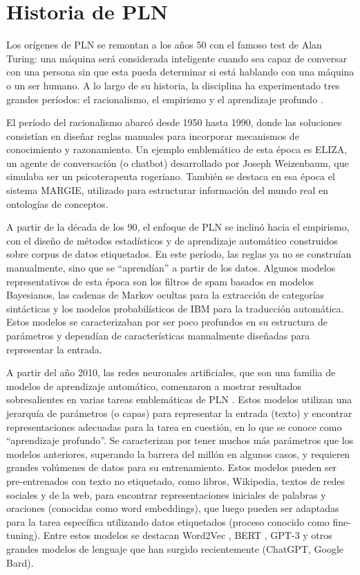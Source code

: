 \section{Historia de PLN}

Los orígenes de PLN se remontan a los años 50 con el famoso test de Alan Turing: una máquina será considerada inteligente cuando sea capaz de conversar con una persona sin que esta pueda determinar si está hablando con una máquina o un ser humano. A lo largo de su historia, la disciplina ha experimentado tres grandes períodos: el racionalismo, el empirismo y el aprendizaje profundo \cite{deng2018deep}.

El período del racionalismo abarcó desde 1950 hasta 1990, donde las soluciones consistían en diseñar reglas manuales para incorporar mecanismos de conocimiento y razonamiento. Un ejemplo emblemático de esta época es ELIZA, un agente de conversación (o chatbot) desarrollado por Joseph Weizenbaum, que simulaba ser un psicoterapeuta rogeriano. También se destaca en esa época el sistema MARGIE, utilizado para estructurar información del mundo real en ontologías de conceptos.

A partir de la década de los 90, el enfoque de PLN se inclinó hacia el empirismo, con el diseño de métodos estadísticos y de aprendizaje automático construidos sobre corpus de datos etiquetados. En este período, las reglas ya no se construían manualmente, sino que se ``aprendían'' a partir de los datos. Algunos modelos representativos de esta época son los filtros de spam basados en modelos Bayesianos, las cadenas de Markov ocultas para la extracción de categorías sintácticas y los modelos probabilísticos de IBM para la traducción automática. Estos modelos se caracterizaban por ser poco profundos en su estructura de parámetros y dependían de características manualmente diseñadas para representar la entrada.

A partir del año 2010, las redes neuronales artificiales, que son una familia de modelos de aprendizaje automático, comenzaron a mostrar resultados sobresalientes en varias tareas emblemáticas de PLN \cite{collobert2011natural}. Estos modelos utilizan una jerarquía de parámetros (o capas) para representar la entrada (texto) y encontrar representaciones adecuadas para la tarea en cuestión, en lo que se conoce como ``aprendizaje profundo''. Se caracterizan por tener muchos más parámetros que los modelos anteriores, superando la barrera del millón en algunos casos, y requieren grandes volúmenes de datos para su entrenamiento. Estos modelos pueden ser pre-entrenados con texto no etiquetado, como libros, Wikipedia, textos de redes sociales y de la web, para encontrar representaciones iniciales de palabras y oraciones (conocidas como word embeddings), que luego pueden ser adaptadas para la tarea específica utilizando datos etiquetados (proceso conocido como fine-tuning). Entre estos modelos se destacan Word2Vec \cite{Mikolov2013}, BERT \cite{kenton2019bert}, GPT-3 \cite{brown2020language} y otros grandes modelos de lenguaje que han surgido recientemente (ChatGPT, Google Bard).

